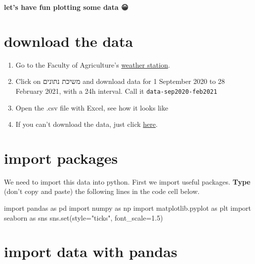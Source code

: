 \documentclass[
  letterpaper,
  DIV=11,
  numbers=noendperiod]{scrreprt}
\newenvironment{Shaded}{\begin{snugshade}}{\end{snugshade}}
\newcommand{\BuiltInTok}[1]{\textcolor[rgb]{0.00,0.23,0.31}{#1}}
\newcommand{\FloatTok}[1]{\textcolor[rgb]{0.68,0.00,0.00}{#1}}
\newcommand{\ImportTok}[1]{\textcolor[rgb]{0.00,0.46,0.62}{#1}}
\newcommand{\NormalTok}[1]{\textcolor[rgb]{0.00,0.23,0.31}{#1}}
\newcommand{\OperatorTok}[1]{\textcolor[rgb]{0.37,0.37,0.37}{#1}}
\newcommand{\StringTok}[1]{\textcolor[rgb]{0.13,0.47,0.30}{#1}}
\providecommand{\tightlist}{%
  \setlength{\itemsep}{0pt}\setlength{\parskip}{0pt}}\usepackage{longtable,booktabs,array}
\begin{document}
\textbf{let's have fun plotting some data 😀}

\hypertarget{download-the-data}{%
\section{download the data}\label{download-the-data}}

\begin{enumerate}
\def\labelenumi{\arabic{enumi}.}
\tightlist
\item
  Go to the Faculty of Agriculture's
  \href{http://www.meteo-tech.co.il/faculty/faculty.asp?client=1}{weather
  station}.
\item
  Click on משיכת נתונים and download data for 1 September 2020 to 28
  February 2021, with a 24h interval. Call it
  \texttt{data-sep2020-feb2021}
\item
  Open the .csv file with Excel, see how it looks like
\item
  If you can't download the data, just click
  \href{/archive/data/data-sep2020-feb2021.csv}{here}.
\end{enumerate}

\hypertarget{import-packages}{%
\section{import packages}\label{import-packages}}

We need to import this data into python. First we import useful
packages. \textbf{Type} (don't copy and paste) the following lines in
the code cell below.

\begin{Shaded}
\begin{Highlighting}[]
\ImportTok{import}\NormalTok{ pandas }\ImportTok{as}\NormalTok{ pd}
\ImportTok{import}\NormalTok{ numpy }\ImportTok{as}\NormalTok{ np}
\ImportTok{import}\NormalTok{ matplotlib.pyplot }\ImportTok{as}\NormalTok{ plt}
\ImportTok{import}\NormalTok{ seaborn }\ImportTok{as}\NormalTok{ sns}
\NormalTok{sns.}\BuiltInTok{set}\NormalTok{(style}\OperatorTok{=}\StringTok{"ticks"}\NormalTok{, font\_scale}\OperatorTok{=}\FloatTok{1.5}\NormalTok{)}
\end{Highlighting}
\end{Shaded}

\hypertarget{import-data-with-pandas}{%
\section{import data with pandas}\label{import-data-with-pandas}}
\end{document}
